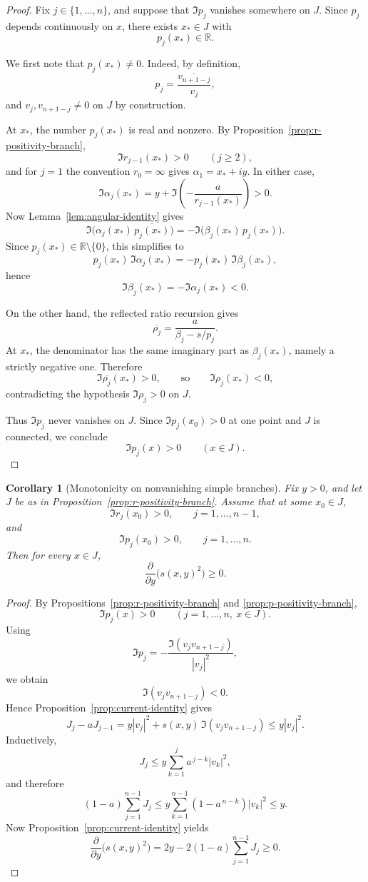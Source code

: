 \documentclass[11pt]{article}
\newtheorem{corollary}[theorem]{Corollary}
\begin{document}
\begin{proof}
Fix \(j\in\{1,\dots,n\}\), and suppose that \(\Im p_j\) vanishes somewhere on \(J\). Since \(p_j\) depends continuously on \(x\), there exists \(x_*\in J\) with
\[
p_j(x_*)\in\mathbb R.
\]

We first note that \(p_j(x_*)\neq 0\). Indeed, by definition,
\[
p_j=\frac{\overline{v_{n+1-j}}}{v_j},
\]
and \(v_j,v_{n+1-j}\neq 0\) on \(J\) by construction.

At \(x_*\), the number \(p_j(x_*)\) is real and nonzero. By Proposition~\ref{prop:r-positivity-branch},
\[
\Im r_{j-1}(x_*)>0
\qquad
(j\ge 2),
\]
and for \(j=1\) the convention \(r_0=\infty\) gives \(\alpha_1=x_*+iy\). In either case,
\[
\Im \alpha_j(x_*)
=
y+\Im\!\left(-\frac{a}{r_{j-1}(x_*)}\right)
>0.
\]
Now Lemma~\ref{lem:angular-identity} gives
\[
\Im\!\bigl(\alpha_j(x_*)\,\overline{p_j(x_*)}\bigr)
=
-\Im\!\bigl(\beta_j(x_*)\,p_j(x_*)\bigr).
\]
Since \(p_j(x_*)\in\mathbb R\setminus\{0\}\), this simplifies to
\[
p_j(x_*)\,\Im \alpha_j(x_*)
=
-p_j(x_*)\,\Im \beta_j(x_*),
\]
hence
\[
\Im \beta_j(x_*)=-\Im \alpha_j(x_*)<0.
\]

On the other hand, the reflected ratio recursion gives
\[
\overline{\rho_j}
=
\frac{a}{\beta_j-s/p_j}.
\]
At \(x_*\), the denominator has the same imaginary part as \(\beta_j(x_*)\), namely a strictly negative one. Therefore
\[
\Im \overline{\rho_j}(x_*)>0,
\qquad\text{so}\qquad
\Im \rho_j(x_*)<0,
\]
contradicting the hypothesis \(\Im \rho_j>0\) on \(J\).

Thus \(\Im p_j\) never vanishes on \(J\). Since \(\Im p_j(x_0)>0\) at one point and \(J\) is connected, we conclude
\[
\Im p_j(x)>0
\qquad
(x\in J).
\]
\end{proof}

\begin{corollary}[Monotonicity on nonvanishing simple branches]\label{cor:monotonicity-on-branch}
Fix \(y>0\), and let \(J\) be as in Proposition~\ref{prop:r-positivity-branch}. Assume that at some \(x_0\in J\),
\[
\Im r_j(x_0)>0,
\qquad
j=1,\dots,n-1,
\]
and
\[
\Im p_j(x_0)>0,
\qquad
j=1,\dots,n.
\]
Then for every \(x\in J\),
\[
\frac{\partial}{\partial y}\bigl(s(x,y)^2\bigr)\ge 0.
\]
\end{corollary}

\begin{proof}
By Propositions~\ref{prop:r-positivity-branch} and \ref{prop:p-positivity-branch},
\[
\Im p_j(x)>0
\qquad
(j=1,\dots,n,\ x\in J).
\]
Using
\[
\Im p_j
=
-\frac{\Im(v_jv_{n+1-j})}{|v_j|^2},
\]
we obtain
\[
\Im(v_jv_{n+1-j})<0.
\]
Hence Proposition~\ref{prop:current-identity} gives
\[
J_j-aJ_{j-1}
=
y|v_j|^2+s(x,y)\,\Im(v_jv_{n+1-j})
\le y|v_j|^2.
\]
Inductively,
\[
J_j\le y\sum_{k=1}^j a^{\,j-k}|v_k|^2,
\]
and therefore
\[
(1-a)\sum_{j=1}^{n-1}J_j
\le
y\sum_{k=1}^{n-1}(1-a^{\,n-k})|v_k|^2
\le
y.
\]
Now Proposition~\ref{prop:current-identity} yields
\[
\frac{\partial}{\partial y}\bigl(s(x,y)^2\bigr)
=
2y-2(1-a)\sum_{j=1}^{n-1}J_j
\ge 0.
\]
\end{proof}
\end{document}
